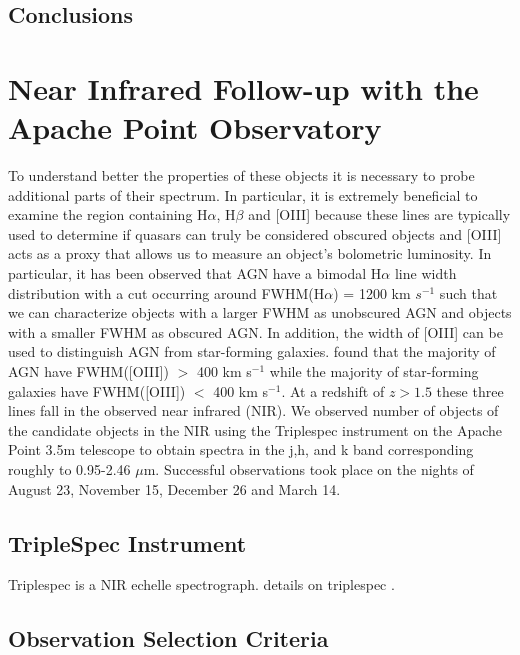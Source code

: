 \documentclass[preprint]{aastex}
\begin{document}
\subsection{Conclusions}

\pagebreak

\section{Near Infrared Follow-up with the Apache Point Observatory}

To understand better the properties of these objects it is necessary to probe additional parts of their spectrum.  In particular, it is extremely beneficial to examine the region containing H$\alpha$, H$\beta$ and [OIII] because these lines are typically used to determine if quasars can truly be considered obscured objects and [OIII] acts as a proxy that allows us to measure an object's bolometric luminosity.  In particular, it has been observed that AGN have a bimodal H$\alpha$ line width distribution with a cut occurring around FWHM(H$\alpha$) = 1200 km $s^{-1}$ \citep{2003AJ....126.2125Z} such that we can characterize objects with a larger FWHM as unobscured AGN and objects with a smaller FWHM as obscured AGN.  In addition, the width of [OIII] can be used to distinguish AGN from star-forming galaxies.  \citet{2005AJ....129.1783H} found that the majority of AGN have FWHM([OIII]) $>$ 400 km s$^{-1}$ while the majority of star-forming galaxies have FWHM([OIII]) $<$ 400 km s$^{-1}$.  At a redshift of $z > 1.5$ these three lines fall in the observed near infrared (NIR).  We observed \color{red}number of objects\color{black} of the candidate objects in the NIR using the Triplespec instrument on the Apache Point 3.5m telescope to obtain spectra in the j,h, and k band corresponding roughly to 0.95-2.46 $\mu$m.  Successful observations took place on the nights of August 23, November 15, December 26 and March 14.

\subsection{TripleSpec Instrument}
Triplespec is a NIR echelle spectrograph.  \color{red} details on triplespec \color{black}.  

\subsection{Observation Selection Criteria} 
\end{document}
